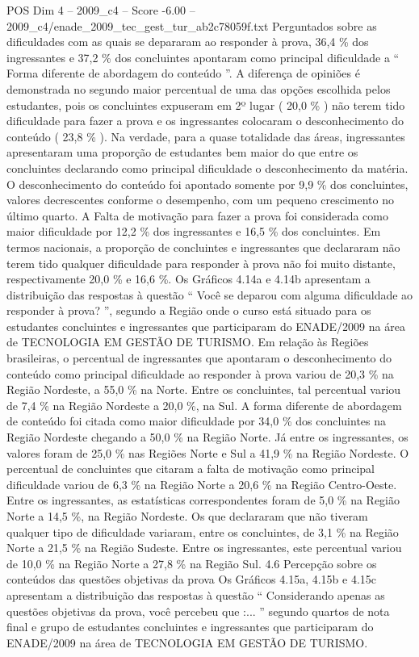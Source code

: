 \begin{textsample}{POS Dim 4 – 2009\_c4 – Score -6.00 – 2009\_c4/enade\_2009\_tec\_gest\_tur\_ab2c78059f.txt}
Perguntados sobre as dificuldades com as quais se depararam ao responder à prova, 36,4 \% dos ingressantes e 37,2 \% dos concluintes apontaram como principal dificuldade a “ Forma diferente de abordagem do conteúdo ”.
A diferença de opiniões é demonstrada no segundo maior percentual de uma das opções escolhida pelos estudantes, pois os concluintes expuseram em 2º lugar ( 20,0 \% ) não terem tido dificuldade para fazer a prova e os ingressantes colocaram o desconhecimento do conteúdo ( 23,8 \% ).
Na verdade, para a quase totalidade das áreas, ingressantes apresentaram uma proporção de estudantes bem maior do que entre os concluintes declarando como principal dificuldade o desconhecimento da matéria.
O desconhecimento do conteúdo foi apontado somente por 9,9 \% dos concluintes, valores decrescentes conforme o desempenho, com um pequeno crescimento no último quarto.
A Falta de motivação para fazer a prova foi considerada como maior dificuldade por 12,2 \% dos ingressantes e 16,5 \% dos concluintes.
Em termos nacionais, a proporção de concluintes e ingressantes que declararam não terem tido qualquer dificuldade para responder à prova não foi muito distante, respectivamente 20,0 \% e 16,6 \%.
Os Gráficos 4.14a e 4.14b apresentam a distribuição das respostas à questão “ Você se deparou com alguma dificuldade ao responder à prova? ”, segundo a Região onde o curso está situado para os estudantes concluintes e ingressantes que participaram do ENADE/2009 na área de TECNOLOGIA EM GESTÃO DE TURISMO.
Em relação às Regiões brasileiras, o percentual de ingressantes que apontaram o desconhecimento do conteúdo como principal dificuldade ao responder à prova variou de 20,3 \% na Região Nordeste, a 55,0 \% na Norte.
Entre os concluintes, tal percentual variou de 7,4 \% na Região Nordeste a 20,0 \%, na Sul.
A forma diferente de abordagem de conteúdo foi citada como maior dificuldade por 34,0 \% dos concluintes na Região Nordeste chegando a 50,0 \% na Região Norte.
Já entre os ingressantes, os valores foram de 25,0 \% nas Regiões Norte e Sul a 41,9 \% na Região Nordeste.
O percentual de concluintes que citaram a falta de motivação como principal dificuldade variou de 6,3 \% na Região Norte a 20,6 \% na Região Centro-Oeste.
Entre os ingressantes, as estatísticas correspondentes foram de 5,0 \% na Região Norte a 14,5 \%, na Região Nordeste.
Os que declararam que não tiveram qualquer tipo de dificuldade variaram, entre os concluintes, de 3,1 \% na Região Norte a 21,5 \% na Região Sudeste.
Entre os ingressantes, este percentual variou de 10,0 \% na Região Norte a 27,8 \% na Região Sul. 4.6 Percepção sobre os conteúdos das questões objetivas da prova Os Gráficos 4.15a, 4.15b e 4.15c apresentam a distribuição das respostas à questão “ Considerando apenas as questões objetivas da prova, você percebeu que :... ” segundo quartos de nota final e grupo de estudantes concluintes e ingressantes que participaram do ENADE/2009 na área de TECNOLOGIA EM GESTÃO DE TURISMO.

\end{textsample}
